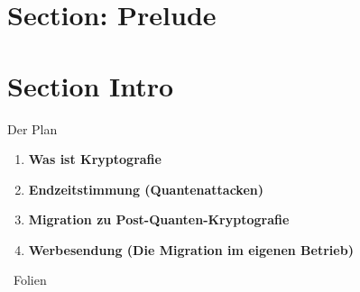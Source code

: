 \section{Section: Prelude}

\section{Section Intro}

\begin{frame}[c]{Der Plan}
  \small

  \begin{enumerate}
    \item \textbf{Was ist Kryptografie}
    \item \textbf{Endzeitstimmung (Quantenattacken)}
    \item \textbf{Migration zu Post-Quanten-Kryptografie}
    \item \textbf{Werbesendung (Die Migration im eigenen Betrieb)}
  \end{enumerate}

	\vfill
	~Folien

  \vfill
\end{frame}



